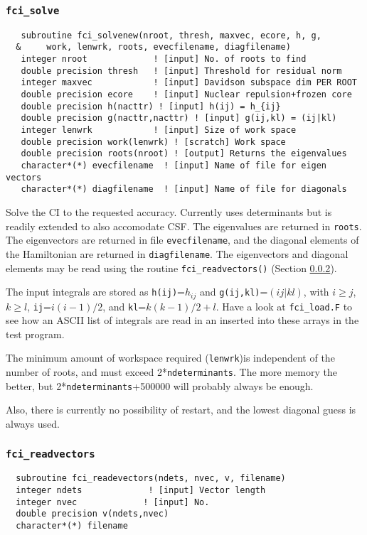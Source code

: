 \documentclass[fullpage,12pt,fleqn]{article}
\begin{document}
\subsubsection{{\tt fci\_solve}}
\label{sec:fcisolve}
\begin{verbatim}
   subroutine fci_solvenew(nroot, thresh, maxvec, ecore, h, g, 
  &     work, lenwrk, roots, evecfilename, diagfilename)
   integer nroot             ! [input] No. of roots to find
   double precision thresh   ! [input] Threshold for residual norm
   integer maxvec            ! [input] Davidson subspace dim PER ROOT
   double precision ecore    ! [input] Nuclear repulsion+frozen core
   double precision h(nacttr) ! [input] h(ij) = h_{ij}
   double precision g(nacttr,nacttr) ! [input] g(ij,kl) = (ij|kl)
   integer lenwrk            ! [input] Size of work space
   double precision work(lenwrk) ! [scratch] Work space
   double precision roots(nroot) ! [output] Returns the eigenvalues
   character*(*) evecfilename  ! [input] Name of file for eigen vectors
   character*(*) diagfilename  ! [input] Name of file for diagonals
\end{verbatim}

Solve the CI to the requested accuracy.  Currently uses determinants
but is readily extended to also accomodate CSF.  The eigenvalues are
returned in \verb!roots!.  The eigenvectors are returned in file
\verb!evecfilename!, and the diagonal elements of the Hamiltonian are
returned in \verb!diagfilename!.  The eigenvectors and diagonal
elements may be read using the routine \verb!fci_readvectors()!
(Section \ref{sec:fcireadvectors}).

The input integrals are stored as
\verb!h(ij)!=$h_{ij}$ and \verb!g(ij,kl)!=$(ij|kl)$, with $i \geq j$,
$k \geq l$, \verb!ij!=$i(i-1)/2$, and \verb!kl!=$k(k-1)/2+l$.  Have a
look at \verb!fci_load.F! to see how an ASCII list of integrals are
read in an inserted into these arrays in the test program.

The minimum amount of workspace required (\verb!lenwrk!)is independent
of the number of roots, and must exceed 2*\verb!ndeterminants!.  The
more memory the better, but 2*\verb!ndeterminants!+500000 will
probably always be enough.

Also, there is currently no possibility of restart, and the lowest
diagonal guess is always used.

\subsubsection{{\tt fci\_readvectors}}
\label{sec:fcireadvectors}
\begin{verbatim}
  subroutine fci_readevectors(ndets, nvec, v, filename)
  integer ndets             ! [input] Vector length
  integer nvec             ! [input] No. 
  double precision v(ndets,nvec)
  character*(*) filename
\end{verbatim}
\end{document}
